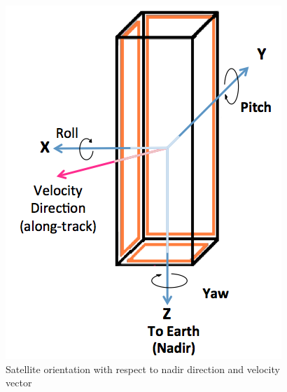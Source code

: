 \documentclass[12pt]{article}
\begin{document}
			\begin{figure}[!h]
				\centering
				\includegraphics[scale=0.5]{images/ADCS_coord.png}
				\caption{Satellite orientation with respect to nadir direction and velocity vector}
				\label{fig:ADCS_orientation}
			\end{figure}
				
\end{document}
